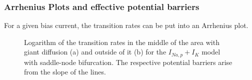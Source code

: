 \documentclass[12pt,a4paper]{article}
\begin{document}
\subsubsection{Arrhenius Plots and effective potential barriers}
For a given bias current, the transition rates can be put into an Arrhenius plot.
\begin{figure}[H]
	\hspace*{-0.5cm}
	\caption{Logarithm of the transition rates in the middle of the area with giant diffusion (a) and outside of it (b) for the $I_{Na,p}+I_K$ model with saddle-node bifurcation. The respective potential barriers arise from the slope of the lines.}
	\label{arrhplots}
\end{figure}
\end{document}
